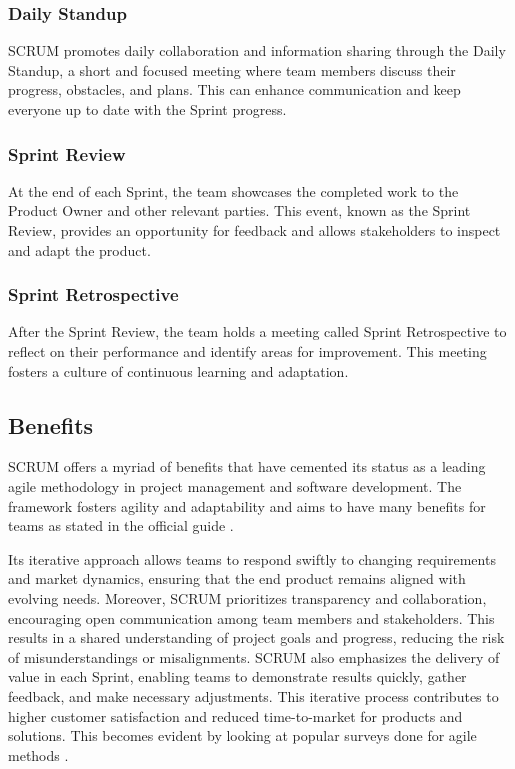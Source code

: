 \subsubsection*{Daily Standup}

SCRUM promotes daily collaboration and information sharing through the Daily Standup, 
a short and focused meeting where team members discuss their progress,
obstacles, and plans. 
This can enhance communication and keep everyone up to
date with the Sprint progress.

\subsubsection*{Sprint Review}

At the end of each Sprint, the team showcases the completed work to the
Product Owner and other relevant parties.
This event, known as the Sprint Review, provides an
opportunity for feedback and allows stakeholders to
inspect and adapt the product.

\subsubsection*{Sprint Retrospective}

After the Sprint Review, the team holds a meeting called Sprint
Retrospective to reflect on their performance and identify
areas for improvement. 
This meeting fosters a culture of continuous learning and adaptation.  

\subsection{Benefits}

SCRUM offers a myriad of benefits that have cemented its status as a
leading agile methodology in project management and software development.
The framework fosters agility and adaptability and 
aims to have many benefits for teams as stated in the official guide \parencite{TheScrumGuide}. 

Its iterative approach allows teams to respond swiftly to changing requirements
and market dynamics, ensuring that the end product remains aligned with evolving needs.
Moreover, SCRUM prioritizes transparency and collaboration,
encouraging open communication among team members and stakeholders.
This results in a shared understanding of project goals and progress, 
reducing the risk of misunderstandings or misalignments. 
SCRUM also emphasizes the delivery of value in each Sprint,
enabling teams to demonstrate results quickly, gather feedback,
and make necessary adjustments. This iterative process contributes to higher 
customer satisfaction and reduced time-to-market for products and solutions. 
This becomes evident by looking at popular surveys done for agile methods \parencite{AgileTransformationSurvey} \parencite{StateOfAgile2023}.

